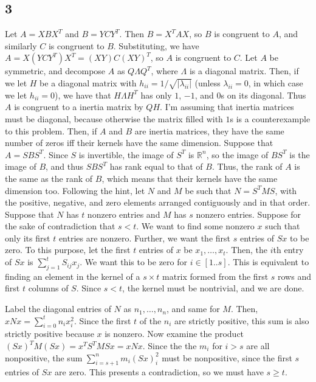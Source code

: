 \documentclass{article}
\newcommand{\rn}{\mathbb{R}}
\begin{document}
\subsection*{3}
Let $A=XBX^{T}$ and $B=YCY^{T}$. Then $B=X^{T}AX$, so $B$ is congruent to $A$, and similarly $C$ is congruent to $B$. Substituting, we have $A=X(YCY^{T})X^{T}=(XY)C(XY)^{T}$, so $A$ is congruent to $C$.
Let $A$ be symmetric, and decompose $A$ as $Q\Lambda Q^{T}$, where $\Lambda$ is a diagonal matrix. Then, if we let $H$ be a diagonal matrix with $h_{ii}=1/\sqrt{|\lambda_{ii}|}$ (unless $\lambda_{ii}=0$, in which case we let $h_{ii}=0$), we have that $H\Lambda H^T$ has only $1$, $-1$, and $0$s on its diagonal. Thus $A$ is congruent to a inertia matrix by $QH$.
I'm assuming that inertia matrices must be diagonal, because otherwise the matrix filled with $1$s is a counterexample to this problem. Then, if $A$ and $B$ are inertia matrices, they have the same number of zeros iff their kernels have the same dimension. Suppose that $A=SBS^T$. Since $S$ is invertible, the image of $S^T$ is $\rn^n$, so the image of $BS^T$ is the image of $B$, and thus $SBS^T$ has rank equal to that of $B$. Thus, the rank of $A$ is the same as the rank of $B$, which means that their kernels have the same dimension too.
Following the hint, let $N$ and $M$ be such that $N=S^TMS$, with the positive, negative, and zero elements arranged contiguously and in that order. Suppose that $N$ has $t$ nonzero entries and $M$ has $s$ nonzero entries. Suppose for the sake of contradiction that $s<t$. We want to find some nonzero $x$ such that only its first $t$ entries are nonzero. Further, we want the first $s$ entries of $Sx$ to be zero. To this purpose, let the first $t$ entries of $x$ be $x_1,\ldots,x_t$. Then, the $i$th entry of $Sx$ is $\sum_{j=1}^t S_{ij}x_j$. We want this to be zero for $i\in[1..s]$. This is equivalent to finding an element in the kernel of a $s\times t$ matrix formed from the first $s$ rows and first $t$ columns of $S$. Since $s<t$, the kernel must be nontrivial, and we are done.

Label the diagonal entries of $N$ as $n_1,\ldots,n_n$, and same for $M$. Then, $xNx=\sum_{i=0}^t n_ix_i^2$. Since the first $t$ of the $n_i$ are strictly positive, this sum is also strictly positive because $x$ is nonzero. Now examine the product $(Sx)^TM(Sx)=x^TS^TMSx=xNx$. Since the the $m_i$ for $i>s$ are all nonpositive, the sum $\sum_{i=s+1}^nm_i(Sx)_i^2$ must be nonpositive, since the first $s$ entries of $Sx$ are zero. This presents a contradiction, so we must have $s\geq t$.
\end{document}
